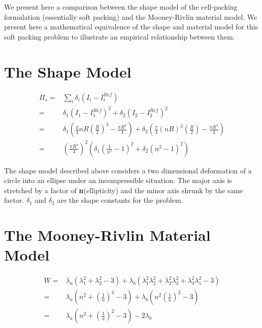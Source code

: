 \documentclass[idxtotoc,hyperref,openany]{labbook} %
\begin{document}


%

We present here a comparison between the shape model of the cell-packing formulation (essentially soft packing) and the Mooney-Rivlin material model. We present here a mathematical equivalence of the shape and material model for this soft packing problem to illustrate an empirical relationship between them. 

\section{The Shape Model}
\begin{align}
\Pi_s = & \sum_i \delta_i (I_i - I_i^{Ref}) \nonumber\\
=& \delta_1 (I_1 - I_1^{Ref})^2 + \delta_2 (I_2 - I_2^{Ref})^2 \nonumber\\
=& \delta_1 (\frac{\pi}{4}nR(\frac{R}{2})^3 - \frac{\pi R^4}{4}) + \delta_2 (\frac{\pi}{4}(nR)^3(\frac{R}{2}) - \frac{\pi R^4}{4})\nonumber\\
=& (\frac{\pi R^4}{4})^2(\delta_1 (\frac{1}{n^2}-1)^2 + \delta_2(n^2 - 1)^2)
\end{align}

The shape model described above considers a two dimensional deformation of a circle into an ellipse under an incompressible situation. The major axis is stretched by a factor of \textbf{n}(ellipticity) and the minor axis shrunk by the same factor. $\delta_1$ and $\delta_2$ are the shape constants for the problem. 

\section{The Mooney-Rivlin Material Model}
\begin{align}
W = & \lambda_a(\lambda_1^2 + \lambda_2^2 - 3) + \lambda_b(\lambda_1^2\lambda_2^2 + \lambda_2^2\lambda_3^2 + \lambda_3^2\lambda_1^2 - 3)\nonumber\\
=& \lambda_a(n^2 + (\frac{1}{n})^2 - 3) + \lambda_b(n^2(\frac{1}{n})^2 - 3)\nonumber\\
=& \lambda_a(n^2 + (\frac{1}{n})^2 - 3) - 2 \lambda_b
\end{align}
 
\end{document}
